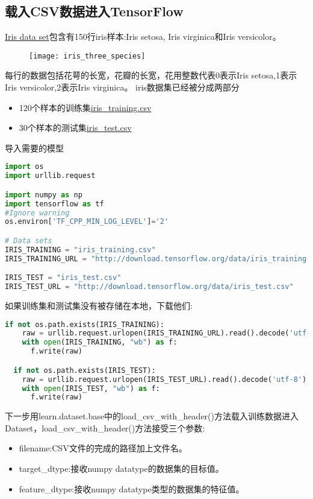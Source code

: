 \subsection{载入CSV数据进入TensorFlow}
\href{https://en.wikipedia.org/wiki/Iris_flower_data_set}{Iris data set}包含有150行iris样本:Iris setosa, Iris virginica和Iris versicolor。
\begin{figure}[H]
\texttt{[image: iris\_three\_species]}
\end{figure}
每行的数据包括花萼的长宽，花瓣的长宽，花用整数代表0表示Iris setosa,1表示 Iris versicolor,2表示Iris virginica。
iris数据集已经被分成两部分
\begin{itemize}
    \item 120个样本的训练集\href{http://download.tensorflow.org/data/iris_training.csv}{iris\_training.csv}
    \item 30个样本的测试集\href{http://download.tensorflow.org/data/iris_test.csv}{iris\_test.csv}
\end{itemize}
导入需要的模型
\begin{lstlisting}[language=Python]
import os
import urllib.request

import numpy as np
import tensorflow as tf
#Ignore warning
os.environ['TF_CPP_MIN_LOG_LEVEL']='2' 

# Data sets
IRIS_TRAINING = "iris_training.csv"
IRIS_TRAINING_URL = "http://download.tensorflow.org/data/iris_training.csv"

IRIS_TEST = "iris_test.csv"
IRIS_TEST_URL = "http://download.tensorflow.org/data/iris_test.csv"
\end{lstlisting}
如果训练集和测试集没有被存储在本地，下载他们:
\begin{lstlisting}[language=Python]
if not os.path.exists(IRIS_TRAINING):
    raw = urllib.request.urlopen(IRIS_TRAINING_URL).read().decode('utf-8')
    with open(IRIS_TRAINING, "wb") as f:
      f.write(raw)

  if not os.path.exists(IRIS_TEST):
    raw = urllib.request.urlopen(IRIS_TEST_URL).read().decode('utf-8')
    with open(IRIS_TEST, "wb") as f:
      f.write(raw)
\end{lstlisting}
下一步用learn.dataset.base中的load\_csv\_with\_header()方法载入训练数据进入Dataset，load\_csv\_with\_header()方法接受三个参数:
\begin{itemize}
    \item filename:CSV文件的完成的路径加上文件名。
    \item target\_dtype:接收numpy datatype的数据集的目标值。
    \item feature\_dtype:接收numpy datatype类型的数据集的特征值。
\end{itemize}
